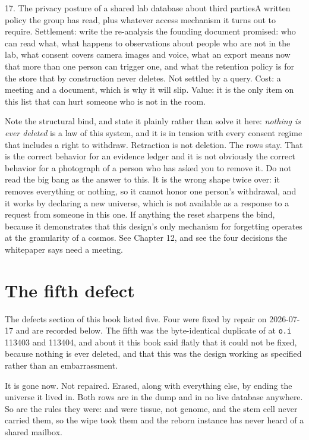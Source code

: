 \begin{Open}{17. The privacy posture of a shared lab database about third parties}{A written policy the group has read, plus whatever access mechanism it turns out to require.}
Settlement: write the re-analysis the founding document promised: who can read what, what happens to observations about people who are not in the lab, what consent covers camera images and voice, what an export means now that more than one person can trigger one, and what the retention policy is for the store that by construction never deletes. Not settled by a query. Cost: a meeting and a document, which is why it will slip. Value: it is the only item on this list that can hurt someone who is not in the room.

Note the structural bind, and state it plainly rather than solve it here: \textit{nothing is ever deleted} is a law of this system, and it is in tension with every consent regime that includes a right to withdraw. Retraction is not deletion. The rows stay. That is the correct behavior for an evidence ledger and it is not obviously the correct behavior for a photograph of a person who has asked you to remove it. Do not read the big bang as the answer to this. It is the wrong shape twice over: it removes everything or nothing, so it cannot honor one person's withdrawal, and it works by declaring a new universe, which is not available as a response to a request from someone in this one. If anything the reset sharpens the bind, because it demonstrates that this design's only mechanism for forgetting operates at the granularity of a cosmos. See Chapter 12, and see the four decisions the whitepaper says need a meeting.
\end{Open}

\section{The fifth defect}

The defects section of this book listed five. Four were fixed by repair on 2026-07-17 and are recorded below. The fifth was the byte-identical duplicate of  at \texttt{o.i} 113403 and 113404, and about it this book said flatly that it could not be fixed, because nothing is ever deleted, and that this was the design working as specified rather than an embarrassment.

It is gone now. Not repaired. Erased, along with everything else, by ending the universe it lived in. Both rows are in the dump and in no live database anywhere. So are the rules they were:  and  were \labLineageName{} tissue, not genome, and the stem cell never carried them, so the wipe took them and the reborn instance has never heard of a shared mailbox.


